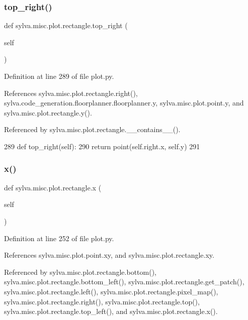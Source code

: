 \subsubsection{\texorpdfstring{top\+\_\+right()}{top\_right()}}
{\footnotesize\ttfamily def sylva.\+misc.\+plot.\+rectangle.\+top\+\_\+right (\begin{DoxyParamCaption}\item[{}]{self }\end{DoxyParamCaption})}



Definition at line 289 of file plot.\+py.



References sylva.\+misc.\+plot.\+rectangle.\+right(), sylva.\+code\+\_\+generation.\+floorplanner.\+floorplanner.\+y, sylva.\+misc.\+plot.\+point.\+y, and sylva.\+misc.\+plot.\+rectangle.\+y().



Referenced by sylva.\+misc.\+plot.\+rectangle.\+\_\+\+\_\+contains\+\_\+\+\_\+().


\begin{DoxyCode}
289     \textcolor{keyword}{def }top\_right(self):
290       \textcolor{keywordflow}{return} point(self.right.x, self.y)
291 
\end{DoxyCode}
\mbox{\label{classsylva_1_1misc_1_1plot_1_1rectangle_a935b64e6f087b6ab153df8a45e6dd72d}} 
\subsubsection{\texorpdfstring{x()}{x()}\hspace{0.1cm}{\footnotesize\ttfamily [1/2]}}
{\footnotesize\ttfamily def sylva.\+misc.\+plot.\+rectangle.\+x (\begin{DoxyParamCaption}\item[{}]{self }\end{DoxyParamCaption})}



Definition at line 252 of file plot.\+py.



References sylva.\+misc.\+plot.\+point.\+xy, and sylva.\+misc.\+plot.\+rectangle.\+xy.



Referenced by sylva.\+misc.\+plot.\+rectangle.\+bottom(), sylva.\+misc.\+plot.\+rectangle.\+bottom\+\_\+left(), sylva.\+misc.\+plot.\+rectangle.\+get\+\_\+patch(), sylva.\+misc.\+plot.\+rectangle.\+left(), sylva.\+misc.\+plot.\+rectangle.\+pixel\+\_\+map(), sylva.\+misc.\+plot.\+rectangle.\+right(), sylva.\+misc.\+plot.\+rectangle.\+top(), sylva.\+misc.\+plot.\+rectangle.\+top\+\_\+left(), and sylva.\+misc.\+plot.\+rectangle.\+x().


